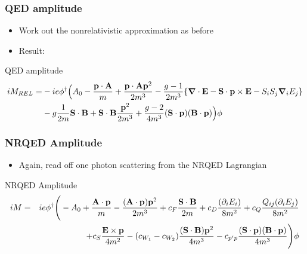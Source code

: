 \documentclass[11ppt]{beamer}
\newcommand{\smalldot}{\cdot}
\newcommand{\beqa}{\begin{eqnarray*} }
\newcommand{\eeqa}{\end{eqnarray*} }
\newcommand{\beq}{\begin{equation*} }
\newcommand{\eeq}{\end{equation*} }
\newcommand{\Sitem}[1]{ \begin{itemize} \item #1 \end{itemize} }
\begin{document}
\begin{frame}
\frametitle{QED amplitude}
\begin{itemize}
\item Work out the nonrelativistic approximation as before
\item Result:
\end{itemize}
\begin{block}{QED amplitude}
\footnotesize
\beq 
\begin{split}
iM_{REL} =& -ie \phi^\dagger \Big (
		 A_0  - \frac{\v{p}\cdot \v{A} }{m} + \frac{\v{p}\cdot \v{A} \v{p}^2}{2m^3}
		- \frac{g-1}{2m^3}\{ \grad \cdot \v{E} -  \v{S} \cdot \v{p} \times \v{E} - S_i S_j \grad_i E_j \}
		\\& - g\frac{1}{2m} \v{S} \cdot \v{B}
		+ \v{S} \cdot \v{B} \frac{\v{p}^2}{2m^3}
		+ \frac{g-2}{4m^3}(\v{S} \cdot \v{p} )( \v{B} \cdot \v{p})
	\Big ) \phi
\end{split}
\eeq
\normalsize
\end{block}
\end{frame}


\begin{frame}
\frametitle{NRQED Amplitude}
\Sitem{Again, read off one photon scattering from the NRQED Lagrangian}
\begin{block}{NRQED Amplitude}
\footnotesize
\beqa
	iM &=&
		ie\phi^\dagger \Bigg(  -A_0 +  \frac{ \v{A} \cdot \v{p} }{m} - \frac{  (\v{A} \cdot \v{p}) \v{p}^2   }{2m^3} 
		+ c_F  \frac{\v{S} \smalldot \v{B}} {2m}   	
		+ c_D \frac{ ( \partial_i E_i ) }{8m^2}	
		+ c_Q \frac{ Q_{ij} ( \partial_i E_j ) }{8m^2}	
	\\&&	+ c_S \frac{  \v{E} \times \v{p} }{4m^2}
		- (c_{W_1} -c_{W_2}) \frac{   (\v{S} \smalldot \v{B} ) \v{p}^2  }{4m^3}	
		-  c_{p'p} \frac{   (\v{S} \smalldot \v{p}) (\v{B} \smalldot \v{p})  }{4m^3} \Bigg )\phi
\eeqa
\normalsize
\end{block}
\end{frame}
\end{document}
